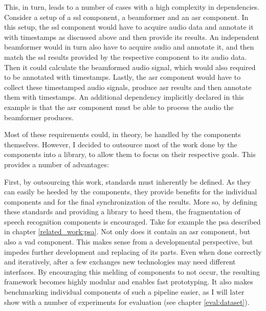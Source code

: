 This, in turn, leads to a number of cases with a high complexity in dependencies.
Consider a setup of a \gls{ssl} component, a beamformer and an \gls{asr} component.
In this setup, the \gls{ssl} component would have to acquire audio data and annotate it with timestamps as discussed above and then provide its results.
An independent beamformer would in turn also have to acquire audio and annotate it, and then match the \gls{ssl} results provided by the respective component to its audio data.
Then it could calculate the beamformed audio signal, which would also required to be annotated with timestamps.
Lastly, the \gls{asr} component would have to collect these timestamped audio signals, produce \gls{asr} results and then annotate them with timestamps.
An additional dependency implicitly declared in this example is that the \gls{asr} component must be able to process the audio the beamformer produces.

Most of these requirements could, in theory, be handled by the components themselves.
However, I decided to outsource most of the work done by the components into a library, to allow them to focus on their respective goals.
This provides a number of advantages:

First, by outsourcing this work, standards must inherently be defined.
As they can easily be heeded by the components, they provide benefits for the individual components and for the final synchronization of the results.
More so, by defining these standards and providing a library to heed them, the fragmentation of speech recognition components is encouraged. 
Take for example the \gls{psa} described in chapter \ref{related_work:psa}.
Not only does it contain an \gls{asr} component, but also a \gls{vad} component.
This makes sense from a developmental perspective, but impedes further development and replacing of its parts.
Even when done correctly and iteratively, after a few exchanges new technologies may need different interfaces.
By encouraging this melding of components to not occur, the resulting framework becomes highly modular and enables fast prototyping.
It also makes benchmarking individual components of such a pipeline easier, as I will later show with a number of experiments for evaluation (see chapter \ref{eval:dataset}).

